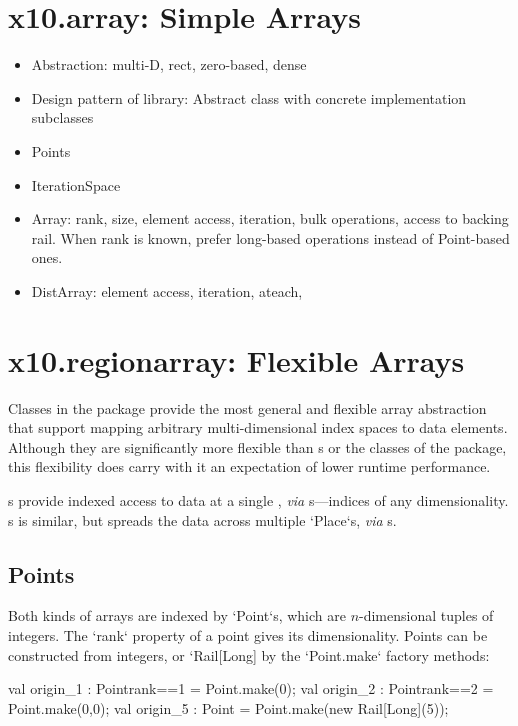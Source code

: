 \section{x10.array: Simple Arrays}

\begin{itemize}
\item Abstraction: multi-D, rect, zero-based, dense
\item Design pattern of library:  Abstract class with concrete
  implementation subclasses
\item Points
\item IterationSpace
\item Array: rank, size, element access, iteration, bulk operations, access to
  backing rail. When rank is known, prefer long-based operations
  instead of Point-based ones.
\item DistArray: element access, iteration, ateach,
\end{itemize}


\section{x10.regionarray: Flexible Arrays}

Classes in the  package provide the most general and 
flexible array abstraction that support mapping arbitrary multi-dimensional
index spaces to data elements. Although they are significantly more
flexible than s or the classes of the 
package, this flexibility does carry with it an expectation of lower
runtime performance. 

s provide indexed access to data at a single , {\em via}
s---indices of any dimensionality. s is similar, but
spreads the data across multiple \xcd`Place`s, {\em via} s.  

\subsection{Points}\label{point-syntax}

Both kinds of arrays are indexed by \xcd`Point`s, which are $n$-dimensional tuples of
integers.  The \xcd`rank`
property of a point gives its dimensionality.  Points can be constructed from
integers, or \xcd`Rail[Long] by the \xcd`Point.make` factory methods:
\begin{xten}
val origin_1 : Point{rank==1} = Point.make(0);
val origin_2 : Point{rank==2} = Point.make(0,0);
val origin_5 : Point = Point.make(new Rail[Long](5));
\end{xten}

